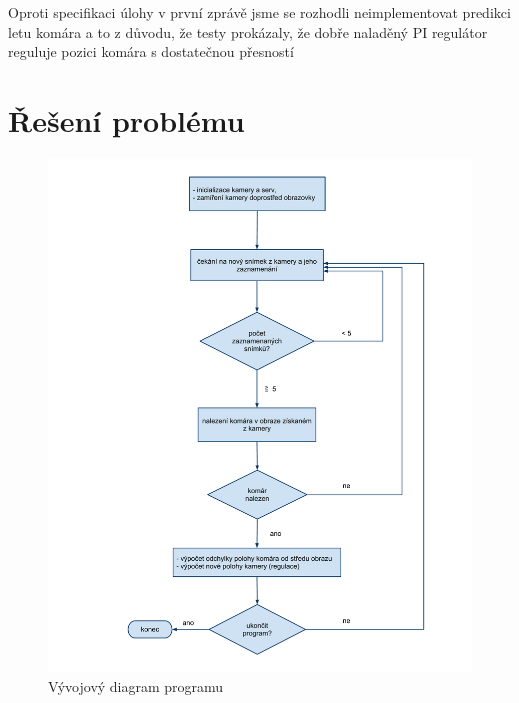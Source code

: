 \documentclass[a4paper,10pt]{article}
\begin{document}
		Oproti specifikaci úlohy v první zprávě jsme se rozhodli neimplementovat predikci letu komára 
		a to z důvodu, že testy prokázaly, že dobře naladěný PI regulátor reguluje pozici komára s dostatečnou 
		přesností 
		
\section{Řešení problému}

		\begin{figure}[!h]
			\centering
			 \includegraphics[width=1\columnwidth]{pics/vyvojovy_diagram_programu}
			 \caption{Vývojový diagram programu}\label{fig:Diagram_programu}
		\end{figure}
\end{document}
